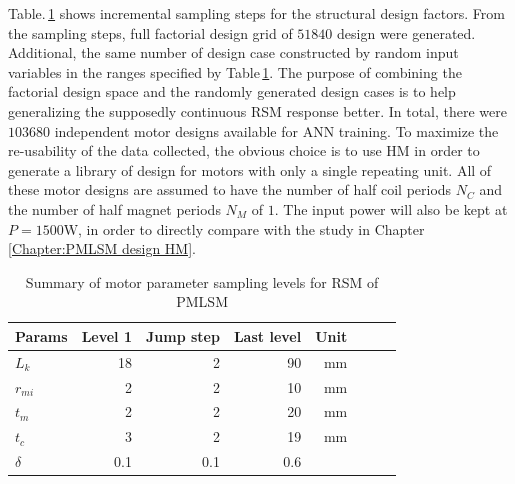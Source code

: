             
            Table.\,\ref{table:RSM design level for PMLSM} shows incremental sampling steps for the structural design factors. From the sampling steps, full factorial design grid of $51840$ design were generated. Additional, the same number of design case constructed by random input variables in the ranges specified by Table\,\ref{table:RSM design level for PMLSM}. The purpose of combining the factorial design space and the randomly generated design cases is to help generalizing the supposedly continuous \acs{RSM} response better. In total, there were $103680$ independent motor designs available for \acs{ANN} training. To maximize the re-usability of the data collected, the obvious choice is to use \acs{HM} in order to generate a library of design for motors with only a single repeating unit. All of these motor designs are assumed to have the number of half coil periods $N_C$ and the number of half magnet periods $N_M$ of $1$. The input power will also be kept at $P=1500\mathrm{W}$, in order to directly compare with the study in Chapter\,\ref{Chapter:PMLSM design HM}.
            
            
            \begin{table}[!h]
                \renewcommand{\arraystretch}{1.2}
                \caption{Summary of motor parameter sampling levels for \acs{RSM} of \acs{PMLSM}}
                \label{table:RSM design level for PMLSM}
                \centering
                \begin{tabular}{@{}l r r r r r r r@{}}
                \hline
                \bfseries Params & \bfseries Level 1 & \bfseries Jump step & \bfseries Last level & \bfseries Unit \\
                \hline
                    $L_k$       &   18     &   2     &   90     &   $\mathrm{mm}$\\
                    $r_{mi}$    &    2     &   2     &   10     &   $\mathrm{mm}$\\
                    $t_m$       &    2     &   2     &   20     &   $\mathrm{mm}$\\
                    $t_c$       &    3     &   2     &   19     &   $\mathrm{mm}$\\
                    $\delta$    &  0.1     & 0.1     &  0.6     &   \\
                \hline
                \end{tabular}
            \end{table}
        
        
